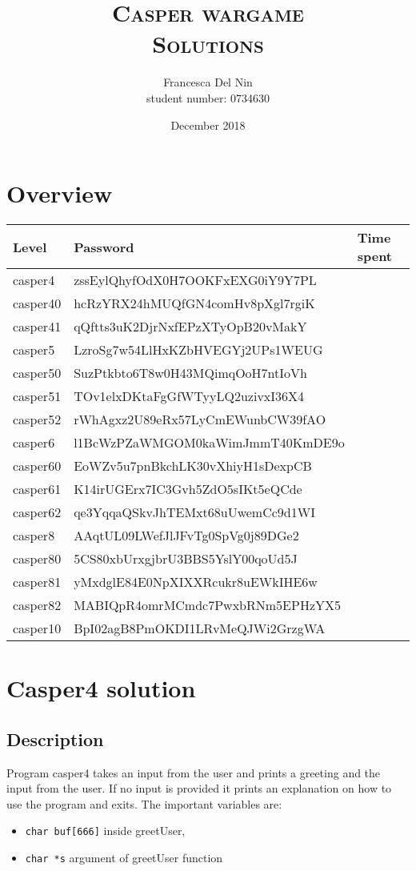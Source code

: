 \documentclass[a4paper,12pt]{article}
\title{\scshape Casper wargame \\ Solutions}
\author{Francesca Del Nin \\ student number: 0734630}
\date{December 2018}
\begin{document}
\maketitle


\section{Overview}
\begin{table}[]
\begin{tabular}{l|l|l}
 Level & Password & Time spent  \\
 \hline
 casper4 & zssEylQhyfOdX0H7OOKFxEXG0iY9Y7PL &   \\
 casper40 & hcRzYRX24hMUQfGN4comHv8pXgl7rgiK & \\
 casper41 & qQftts3uK2DjrNxfEPzXTyOpB20vMakY & \\
 casper5 & LzroSg7w54LlHxKZbHVEGYj2UPs1WEUG & \\
 casper50 & SuzPtkbto6T8w0H43MQimqOoH7ntIoVh & \\
 casper51 & TOv1elxDKtaFgGfWTyyLQ2uzivxI36X4 & \\
 casper52 & rWhAgxz2U89eRx57LyCmEWunbCW39fAO & \\
 casper6 & l1BcWzPZaWMGOM0kaWimJmmT40KmDE9o &  \\
 casper60 & EoWZv5u7pnBkchLK30vXhiyH1sDexpCB & \\
 casper61 & K14irUGErx7IC3Gvh5ZdO5sIKt5eQCde & \\
 casper62 & qe3YqqaQSkvJhTEMxt68uUwemCc9d1WI & \\
 casper8 & AAqtUL09LWefJlJFvTg0SpVg0j89DGe2 & \\
 casper80 & 5CS80xbUrxgjbrU3BBS5YslY00qoUd5J & \\
 casper81 & yMxdglE84E0NpXIXXRcukr8uEWkIHE6w & \\
 casper82 & MABIQpR4omrMCmdc7PwxbRNm5EPHzYX5 & \\
 casper10 & BpI02agB8PmOKDI1LRvMeQJWi2GrzgWA &\\
\end{tabular}
\end{table}

\newpage
\section{Casper4 solution}
\subsection{Description}
Program casper4 takes an input from the user and prints a greeting and the input from the user. If no input is provided it prints an explanation on how to use the program and exits. The important variables are:
\begin{itemize}
\item \texttt{char buf[666]} inside greetUser,
\item \texttt{char *s} argument of greetUser function
\end{itemize}
 
\end{document}
